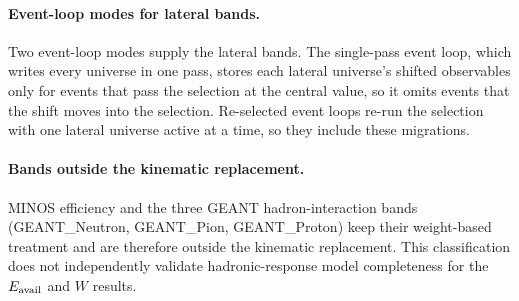 \paragraph{Event-loop modes for lateral bands.} Two event-loop modes supply the lateral bands. The single-pass event loop, which writes every universe in one pass, stores each lateral universe's shifted observables only for events that pass the selection at the central value, so it omits events that the shift moves into the selection. Re-selected event loops re-run the selection with one lateral universe active at a time, so they include these migrations.

\paragraph{Bands outside the kinematic replacement.} MINOS efficiency and the three GEANT hadron-interaction bands (GEANT\_Neutron, GEANT\_Pion, GEANT\_Proton) keep their weight-based treatment and are therefore outside the kinematic replacement. This classification does not independently validate hadronic-response model completeness for the $E_{\mathrm{avail}}$ and $W$ results.

